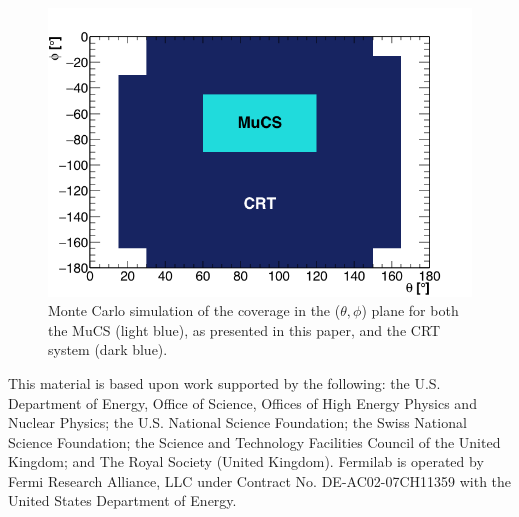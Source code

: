 \documentclass[a4paper,11pt]{article}
\begin{document}
\begin{figure}[htbp]
  \begin{center}
    \includegraphics[width=0.7\linewidth]{figures/crt.png}
    \caption{Monte Carlo simulation of the coverage in the ($\theta,\phi$) plane for both the MuCS (light blue), as presented in this paper, and the CRT system (dark blue).} \label{fig:crt}
  \end{center}
\end{figure}

\acknowledgments

This material is based upon work supported by the following: the U.S. Department of Energy, Office of Science, Offices of High Energy Physics and Nuclear Physics; the U.S. National Science Foundation; the Swiss National Science Foundation; the Science and Technology Facilities Council of the United Kingdom; and The Royal Society (United Kingdom). Fermilab is operated by Fermi Research Alliance, LLC under Contract No. DE-AC02-07CH11359 with the United States Department of Energy.
\end{document}
